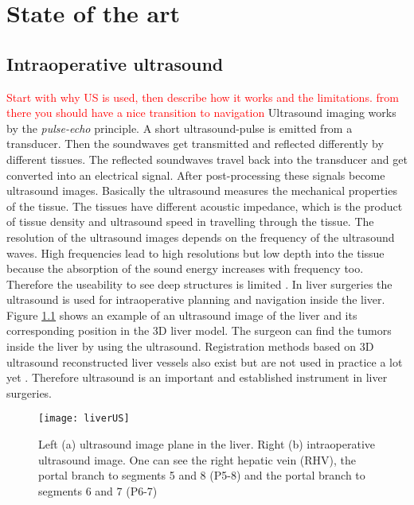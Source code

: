 \chapter{State of the art}

\section{Intraoperative ultrasound}
\textcolor{red}{Start with why US is used, then describe how it works and the limitations. from there you should have a nice transition to navigation}
Ultrasound imaging works by the \textit{pulse-echo} principle. A short
ultrasound-pulse is emitted from a transducer. Then the soundwaves get
transmitted and reflected differently by different tissues. The reflected
soundwaves travel back into the transducer and get converted into an electrical
signal. After post-processing these signals become ultrasound images. Basically
the ultrasound measures the mechanical properties of the tissue. The tissues
have different acoustic impedance, which is the product of tissue density and
ultrasound speed in travelling through the tissue. The resolution of the
ultrasound images depends on the frequency of the ultrasound waves. High
frequencies lead to high resolutions but low depth into the tissue because the
absorption of the sound energy increases with frequency too. Therefore the
useability to see deep structures is limited \cite{torzilli2014ultrasound}. In
liver surgeries the ultrasound is used for intraoperative planning and
navigation inside the liver. Figure \ref{fig:liverUS} shows an example of an
ultrasound image of the liver and its corresponding position in the 3D liver
model. The surgeon can find the tumors inside the liver by using the ultrasound.
Registration methods based on 3D ultrasound reconstructed liver vessels also
exist but are not used in practice a lot yet \cite{lange2003vessel}. Therefore
ultrasound is an important and established instrument in liver surgeries.

\begin{figure}[H]
  \centering
 \texttt{[image: liverUS]}
 \caption{ Left (a) ultrasound image plane in the liver. Right (b) intraoperative
   ultrasound image. One can see the right hepatic vein (RHV), the portal branch
   to segments 5 and 8 (P5-8) and the portal branch to segments 6 and 7 (P6-7) \cite{torzilli2014ultrasound}}
  \label{fig:liverUS}
\end{figure}

